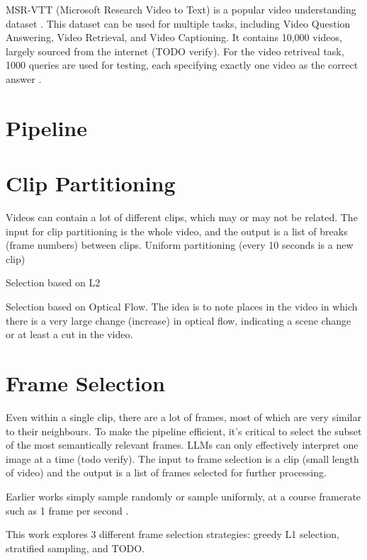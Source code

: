 \documentclass{article}
\begin{document}
MSR-VTT (Microsoft Research Video to Text) is a popular video understanding dataset \cite{msr-vtt}.
This dataset can be used for multiple tasks, including Video Question Answering, Video Retrieval, and Video Captioning.
It contains 10,000 videos, largely sourced from the internet (TODO verify).
For the video retriveal task, 1000 queries are used for testing, each specifying exactly one video as the correct answer \cite{jsfusion}.


\section{Pipeline}




\section{Clip Partitioning}

Videos can contain a lot of different clips, which may or may not be related.
The input for clip partitioning is the whole video, and the output is a list of breaks (frame numbers) between clips.
Uniform partitioning (every 10 seconds is a new clip)

Selection based on L2

Selection based on Optical Flow.
The idea is to note places in the video in which there is a very large change (increase) in optical flow, indicating a scene change or at least a cut in the video.


\section{Frame Selection}

Even within a single clip, there are a lot of frames, most of which are very similar to their neighbours.
To make the pipeline efficient, it's critical to select the subset of the most semantically relevant frames.
LLMs can only effectively interpret one image at a time (todo verify).
The input to frame selection is a clip (small length of video) and the output is a list of frames selected for further processing.

Earlier works simply sample randomly \cite{TODO} or sample uniformly, at a course framerate such as 1 frame per second \cite{clip4clip}.

This work explores 3 different frame selection strategies:
greedy L1 selection, stratified sampling, and TODO.
\end{document}
